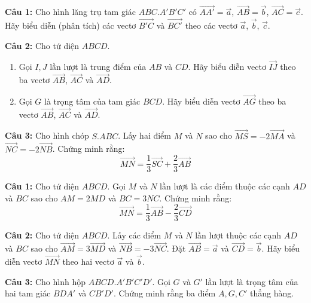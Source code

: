 \documentclass[12pt]{article}
\begin{document}
	\begin{btxanh}[]
		\textbf{Câu 1:} Cho hình lăng trụ tam giác $ABC.A'B'C'$ có $\overrightarrow{AA'} = \vec{a}$, $\overrightarrow{AB} = \vec{b}$, $\overrightarrow{AC} = \vec{c}$. Hãy biểu diễn (phân tích) các vectơ $\overrightarrow{B'C}$ và $\overrightarrow{BC'}$ theo các vectơ $\vec{a}$, $\vec{b}$, $\vec{c}$.
		
		\vspace{0.2cm}
		\textbf{Câu 2:} Cho tứ diện $ABCD$.
		\begin{enumerate}[label=\alph*)]
			\item Gọi $I, J$ lần lượt là trung điểm của $AB$ và $CD$. Hãy biểu diễn vectơ $\overrightarrow{IJ}$ theo ba vectơ $\overrightarrow{AB}$, $\overrightarrow{AC}$ và $\overrightarrow{AD}$.
			\item Gọi $G$ là trọng tâm của tam giác $BCD$. Hãy biểu diễn vectơ $\overrightarrow{AG}$ theo ba vectơ $\overrightarrow{AB}$, $\overrightarrow{AC}$ và $\overrightarrow{AD}$.
		\end{enumerate}
		
		\vspace{0.2cm}
		\textbf{Câu 3:} Cho hình chóp $S.ABC$. Lấy hai điểm $M$ và $N$ sao cho $\overrightarrow{MS} = -2\overrightarrow{MA}$ và $\overrightarrow{NC} = -2\overrightarrow{NB}$. Chứng minh rằng:
		$$ \overrightarrow{MN} = \frac{1}{3}\overrightarrow{SC} + \frac{2}{3}\overrightarrow{AB} $$
	\end{btxanh}
	
	\begin{btvang}[]
		\textbf{Câu 1:} Cho tứ diện $ABCD$. Gọi $M$ và $N$ lần lượt là các điểm thuộc các cạnh $AD$ và $BC$ sao cho $AM = 2MD$ và $BC = 3NC$. Chứng minh rằng:
		$$ \overrightarrow{MN} = \frac{1}{3}\overrightarrow{AB} - \frac{2}{3}\overrightarrow{CD} $$
		
		\vspace{0.2cm}
		\textbf{Câu 2:} Cho tứ diện $ABCD$. Lấy các điểm $M$ và $N$ lần lượt thuộc các cạnh $AD$ và $BC$ sao cho $\overrightarrow{AM} = 3\overrightarrow{MD}$ và $\overrightarrow{NB} = -3\overrightarrow{NC}$. Đặt $\overrightarrow{AB} = \vec{a}$ và $\overrightarrow{CD} = \vec{b}$. Hãy biểu diễn vectơ $\overrightarrow{MN}$ theo hai vectơ $\vec{a}$ và $\vec{b}$.
		
		\vspace{0.2cm}
		\textbf{Câu 3:} Cho hình hộp $ABCD.A'B'C'D'$. Gọi $G$ và $G'$ lần lượt là trọng tâm của hai tam giác $BDA'$ và $CB'D'$. Chứng minh rằng ba điểm $A, G, C'$ thẳng hàng.
	\end{btvang}
	
\end{document}
